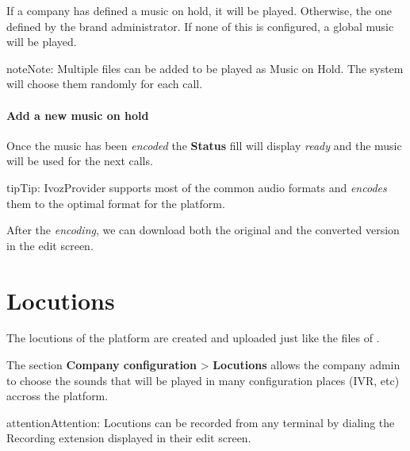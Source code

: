 \documentclass[letterpaper,10pt,english]{sphinxmanual}
\begin{document}
If a company has defined a music on hold, it will be played. Otherwise, the
one defined by the brand administrator. If none of this is configured, a global
music will be played.

\begin{notice}{note}{Note:}
Multiple files can be added to be played as Music on Hold. The system
will choose them randomly for each call.
\end{notice}
\paragraph{Add a new music on hold}

\noindent{}

Once the music has been \emph{encoded} the \textbf{Status} fill will display \emph{ready} and
the music will be used for the next calls.

\noindent{}

\begin{notice}{tip}{Tip:}
IvozProvider supports most of the common audio formats and \emph{encodes}
them to the optimal format for the platform.
\end{notice}

After the \emph{encoding}, we can download both the original and the converted
version in the edit screen.

\noindent{}


\section{Locutions}
\label{pbx_features/sounds:locutions}\label{pbx_features/sounds::doc}
The locutions of the platform are created and uploaded just like the files of
{\hyperref[pbx_features/music_on_hold:musiconhold]{}}.

The section \textbf{Company configuration} \textgreater{} \textbf{Locutions}  allows the company admin
to choose the sounds that will be played in many configuration places (IVR, etc)
accross the platform.

\noindent{}

\begin{notice}{attention}{Attention:}
Locutions can be recorded from any terminal by dialing the
Recording extension displayed in their edit screen.
\end{notice}
\end{document}
